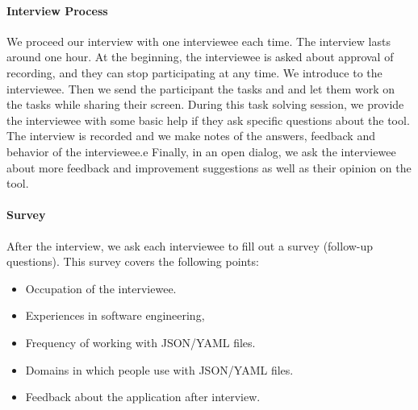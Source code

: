 
\paragraph{Interview Process}
We proceed our interview with one interviewee each time.
The interview lasts around one hour.
At the beginning, the interviewee is asked about approval of recording, and they can stop participating at any time.
We introduce \toolname{} to the interviewee. 
Then we send the participant the tasks and \cfgfile{} and let them work on the tasks while sharing their screen.
During this task solving session, we provide the interviewee with some basic help if they ask specific questions about the tool.
The interview is recorded and we make notes of the answers, feedback and behavior of the interviewee.e
Finally, in an open dialog, we ask the interviewee about more feedback and improvement suggestions as well as their opinion on the tool.

\paragraph{Survey}
After the interview, we ask each interviewee to fill out a survey (follow-up questions).
This survey covers the following points:
\begin{itemize}
    \item Occupation of the interviewee.
    \item Experiences in software engineering,
    \item Frequency of working with JSON/YAML files.
    \item Domains in which people use with JSON/YAML files.
    \item Feedback about the application after interview.
\end{itemize}

